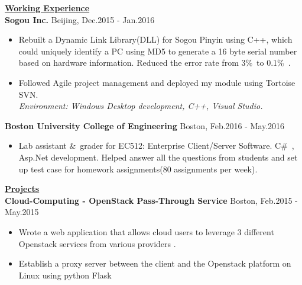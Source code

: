\documentclass{resume} %
\begin{document}
\begin{spacing}{1}
\begin{center}
\uline{{\bf{\LARGE Working Experience}}\hfill{\hspace{10cm}{}}} \\
\vspace{1mm}
{\bf Sogou Inc.} \hfill {\small Beijing, Dec.2015 - Jan.2016} \\
\hspace{-15cm}{Software Development Intern}
\vspace{-2mm}
\begin{itemize}
\item{Rebuilt a Dynamic Link Library(DLL) for Sogou Pinyin using C++, which could uniquely identify a PC using MD5 to generate a 16 byte serial number based on hardware information. Reduced the error rate from 3\%\ to 0.1\%\ .}\\
\vspace{0.3mm}
\item{Followed Agile project management and deployed my module using Tortoise SVN.}\\
\vspace{1mm}
    \hspace{-10.0mm}\textit{Environment: Windows Desktop development, C++, Visual Studio.}
\end{itemize}
{\bf Boston University College of Engineering } \hfill {\small Boston, Feb.2016 - May.2016} \\
\hspace{-16.6cm}{Teaching Assistant}
\vspace{-2mm}
\begin{itemize}
\item{ Lab assistant \&\ grader for EC512: Enterprise Client/Server Software. C\#\ , Asp.Net development. Helped answer all the questions from students and set up test case for homework assignments(80 assignments per week).}\\

\end{itemize}
\vspace{-1mm}
\vspace{2.5mm}
\uline{{\bf{\LARGE Projects}}\hfill{\hspace{10cm}{}}} \\
\vspace{2mm}	
{\bf Cloud-Computing - OpenStack Pass-Through Service } \hfill {\small Boston, Feb.2015 - May.2015} \\
\vspace{0.1mm}
\begin{itemize}
\item{Wrote a web application that allows cloud users to leverage 3 different Openstack services from various providers
.} \\
\item{Establish a proxy server between the client and the Openstack platform on Linux using python Flask } \\


\end{itemize}
\end{center}
\end{spacing}
\end{document}
